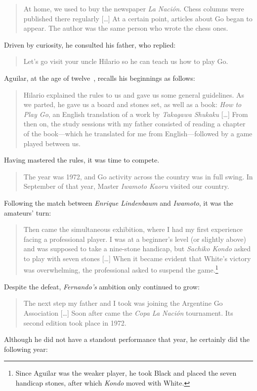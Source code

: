 \begin{quote}
	At home, we used to buy the newspaper \textit{La Nación}. Chess columns were published there regularly [\dots] At a certain point, articles about Go began to appear. The author was the same person who wrote the chess ones.
\end{quote}
Driven by curiosity, he consulted his father, who replied:
\begin{quote}
	Let's go visit your uncle Hilario so he can teach us how to play Go.
\end{quote}
Aguilar, at the age of twelve~\cite{Aguilar3}, recalls his beginnings as follows:
\begin{quote}
	Hilario explained the rules to us and gave us some general guidelines. As we parted, he gave us a board and stones set, as well as a book: \textit{How to Play Go}, an English translation of a work by \textit{Takagawa Shukaku} [\dots] From then on, the study sessions with my father consisted of reading a chapter of the book—which he translated for me from English—followed by a game played between us.
\end{quote}
Having mastered the rules, it was time to compete.
\begin{quote}
	The year was 1972, and Go activity across the country was in full swing. In September of that year, Master \textit{Iwamoto Kaoru} visited our country.
\end{quote}
Following the match between \textit{Enrique Lindenbaum} and \textit{Iwamoto}, it was the amateurs' turn:
\begin{quote}
	Then came the simultaneous exhibition, where I had my first experience facing a professional player. I was at a beginner's level (or slightly above) and was supposed to take a nine-stone handicap, but \textit{Sachiko Kondo} asked to play with seven stones [\dots] When it became evident that White's victory was overwhelming, the professional asked to suspend the game.\footnote{Since Aguilar was the weaker player, he took Black and placed the	seven handicap stones, after which \textit{Kondo} moved with White.}
\end{quote}
Despite the defeat, \textit{Fernando's} ambition only continued to grow:
\begin{quote}
	The next step my father and I took was joining the Argentine Go Association [\dots] Soon after came the \textit{Copa La Nación} tournament. Its second edition took place in 1972.
\end{quote}
Although he did not have a standout performance that year, he certainly did the following year:
